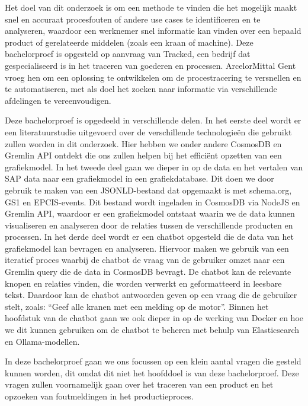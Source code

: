Het doel van dit onderzoek is om een methode te vinden die het mogelijk maakt snel en accuraat procesfouten of andere use cases te identificeren en te analyseren, waardoor een werknemer snel informatie kan vinden over een bepaald product of gerelateerde middelen (zoals een kraan of machine).
Deze bachelorproef is opgesteld op aanvraag van Tracked, een bedrijf dat gespecialiseerd is in het traceren van goederen en processen.
ArcelorMittal Gent vroeg hen om een oplossing te ontwikkelen om de procestracering te versnellen en te automatiseren, met als doel het zoeken naar informatie via verschillende afdelingen te vereenvoudigen.

Deze bachelorproef is opgedeeld in verschillende delen. In het eerste deel wordt er een literatuurstudie uitgevoerd over de verschillende technologieën die gebruikt zullen worden in dit onderzoek.
Hier hebben we onder andere CosmosDB en Gremlin API ontdekt die ons zullen helpen bij het efficiënt opzetten van een grafiekmodel.
In het tweede deel gaan we dieper in op de data en het vertalen van SAP data naar een grafiekmodel in een grafiekdatabase.
Dit doen we door gebruik te maken van een JSONLD-bestand dat opgemaakt is met schema.org, GS1 en EPCIS-events.
Dit bestand wordt ingeladen in CosmosDB via NodeJS en Gremlin API, waardoor er een grafiekmodel ontstaat waarin we de data kunnen visualiseren en analyseren door de relaties tussen de verschillende producten en processen.
In het derde deel wordt er een chatbot opgesteld die de data van het grafiekmodel kan bevragen en analyseren.
Hiervoor maken we gebruik van een iteratief proces waarbij de chatbot de vraag van de gebruiker omzet naar een Gremlin query die de data in CosmosDB bevragt.
De chatbot kan de relevante knopen en relaties vinden, die worden verwerkt en geformatteerd in leesbare tekst.
Daardoor kan de chatbot antwoorden geven op een vraag die de gebruiker stelt, zoals: ``Geef alle kranen met een melding op de motor''.
Binnen het hoofdstuk van de chatbot gaan we ook dieper in op de werking van Docker en hoe we dit kunnen gebruiken om de chatbot te beheren met behulp van Elasticsearch en Ollama-modellen.

In deze bachelorproef gaan we ons focussen op een klein aantal vragen die gesteld kunnen worden, dit omdat dit niet het hoofddoel is van deze bachelorproef.
Deze vragen zullen voornamelijk gaan over het traceren van een product en het opzoeken van foutmeldingen in het productieproces.